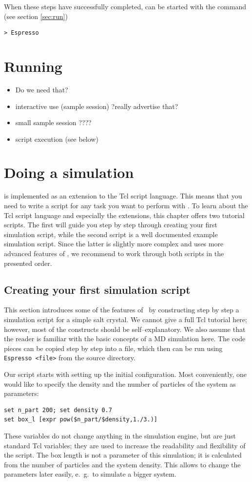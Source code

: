 When these steps have successfully completed, \es{} can be started
with the command (see section \vref{sec:run})
\begin{verbatim}
> Espresso
\end{verbatim}

\section{Running \es{}}
\begin{itemize}
\item Do we need that?
\item interactive use (sample session) ?really advertise that?
\item small sample session ????
\item script execution (see below)
\end{itemize}

\section{Doing a simulation}

\es{} is implemented as an extension to the Tcl script language. This means that you need to write a
script for any task you want to perform with \es. To learn about the Tcl script language and
especially the \es{} extensions, this chapter offers two tutorial scripts. The first will guide you
step by step through creating your first simulation script, while the second script is a well
documented example simulation script. Since the latter is slightly more complex and uses more
advanced features of \es{}, we recommend to work through both scripts in the presented order.

\subsection{Creating your first simulation script}

This section introduces some of the features of \es\ by
constructing step by step a simulation script for a simple salt crystal.
We cannot give a full Tcl tutorial here; however, most of the constructs
should be self--explanatory. We also assume that the reader is familiar with the
basic concepts of a MD simulation here. The code pieces can be copied step by
step into a file, which then can be run using \verb|Espresso <file>| from the
\es{} source directory.

Our script starts with setting up the initial configuration.  Most conveniently,
one would like to specify the density and the number of particles of the system
as parameters:
\begin{verbatim}
set n_part 200; set density 0.7
set box_l [expr pow($n_part/$density,1./3.)]
\end{verbatim}
These variables do not change anything in the simulation engine, but are just
standard Tcl variables; they are used to increase the readability and
flexibility of the script. The box length is not a parameter of this simulation;
it is calculated from the number of particles and the system density. This
allows to change the parameters later easily, e.~g.\ to simulate a bigger
system.


